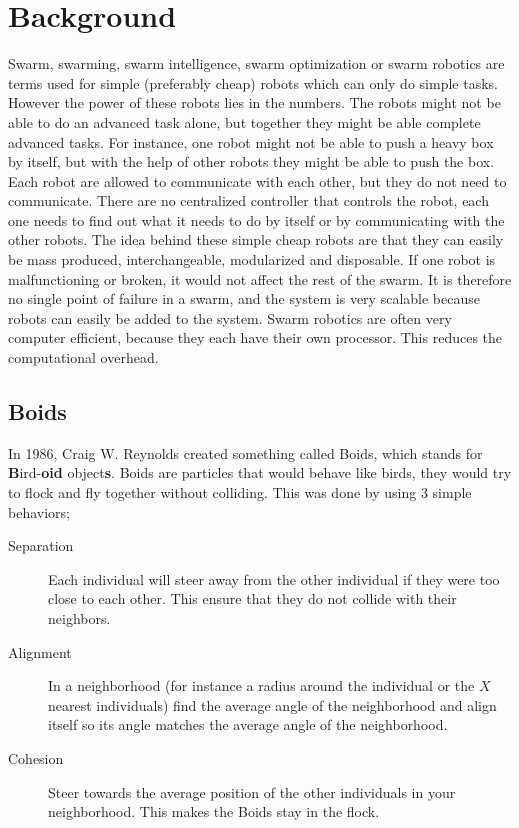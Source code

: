 \section{Background}
Swarm, swarming, swarm intelligence, swarm optimization or swarm robotics are terms used for simple (preferably cheap) robots which can only do simple tasks. However the power of these robots lies in the numbers. The robots might not be able to do an advanced task alone, but together they might be able complete advanced tasks. For instance, one robot might not be able to push a heavy box by itself, but with the help of other robots they might be able to push the box.
Each robot are allowed to communicate with each other, but they do not need to communicate. There are no centralized controller that controls the robot, each one needs to find out what it needs to do by itself or by communicating with the other robots. The idea behind these simple cheap robots are that they can easily be mass produced, interchangeable, modularized and disposable. If one robot is malfunctioning or broken, it would not affect the rest of the swarm. It is therefore no single point of failure in a swarm, and the system is very scalable because robots can easily be added to the system.
Swarm robotics are often very computer efficient, because they each have their own processor. This reduces the computational overhead. 

\subsection{Boids}
In 1986, Craig W. Reynolds created something called Boids, which stands for \textbf{B}ird-\textbf{oid} object\textbf{s}. Boids are particles that would behave like birds, they would try to flock and fly together without colliding. This was done by using 3 simple behaviors;
\begin{description}
    \item[Separation]
        Each individual will steer away from the other individual if they were too close to each other. This ensure that they do not collide with their neighbors.
    \item[Alignment]
        In a neighborhood (for instance a radius around the individual or the $X$ nearest individuals) find the average angle of the neighborhood and align itself so its angle matches the average angle of the neighborhood.
    \item[Cohesion]
        Steer towards the average position of the other individuals in your neighborhood. This makes the Boids stay in the flock.
\end{description}

